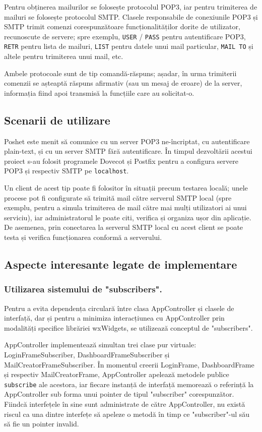 \documentclass[runningheads]{llncs}
\begin{document}
Pentru obținerea mailurilor se folosește protocolul POP3\cite{ref_rfc_pop3}, iar pentru trimiterea de mailuri se folosește protocolul SMTP\cite{ref_rfc_smtp}. Clasele responsabile de conexiunile POP3 și SMTP trimit comenzi corespunzătoare funcționalităților dorite de utilizator, recunoscute de servere; spre exemplu, \texttt{USER} / \texttt{PASS} pentru autentificare POP3, \texttt{RETR} pentru lista de mailuri, \texttt{LIST} pentru datele unui mail particular, \texttt{MAIL TO} și altele pentru trimiterea unui mail, etc.

Ambele protocoale sunt de tip comandă-răspuns; așadar, în urma trimiterii comenzii se așteaptă răspuns afirmativ (sau un mesaj de eroare) de la server, informația fiind apoi transmisă la funcțiile care au solicitat-o.

\subsection{Scenarii de utilizare}
Poshet este menit să comunice cu un server POP3 ne-încriptat, cu autentificare plain-text, și cu un server SMTP fără autentificare. În timpul dezvoltării acestui proiect s-au folosit programele Dovecot și Postfix pentru a configura servere POP3 și respectiv SMTP pe \texttt{localhost}.

Un client de acest tip poate fi folositor în situații precum testarea locală; unele procese pot fi configurate să trimită mail către serverul SMTP local (spre exemplu, pentru a simula trimiterea de mail către mai mulți utilizatori ai unui serviciu), iar administratorul le poate citi, verifica și organiza ușor din aplicație. De asemenea, prin conectarea la serverul SMTP local cu acest client se poate testa și verifica funcționarea conformă a serverului.

\subsection{Aspecte interesante legate de implementare}

\subsubsection{Utilizarea sistemului de "subscribers".} Pentru a evita dependența circulară între clasa AppController și clasele de interfață, dar și pentru a minimiza interacțiunea cu AppController prin modalități specifice librăriei wxWidgets, se utilizează conceptul de "subscribers".

AppController implementează simultan trei clase pur virtuale: LoginFrameSubscriber, DashboardFrameSubscriber și MailCreatorFrameSubscriber. În momentul creerii LoginFrame, DashboardFrame și respectiv MailCreatorFrame, AppController apelează metodele publice \texttt{subscribe} ale acestora, iar fiecare instanță de interfață memorează o referință la AppController sub forma unui pointer de tipul "subscriber" corespunzător. Fiindcă interfețele în sine sunt administrate de către AppController, nu există riscul ca una dintre interfețe să apeleze o metodă în timp ce "subscriber"-ul său să fie un pointer invalid.
\end{document}
